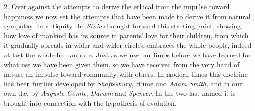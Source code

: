 \documentclass[12pt,a4paper,openany]{book}
\newcommand{\opage}[1]{\marginnote{\footnotesize\textit{[#1]}}}
\begin{document}
2. Over against the attempts to derive the ethical from the impulse toward
happiness we now set the attempts that have been made to derive it from
natural sympathy. In antiquity the \emph{Stoics} brought forward this starting
point, showing how love of \opage{33}mankind has its source in parents' love
for their children, from which it gradually spreads in wider and wider
circles, embraces the whole people, indeed at last the whole human race. Just
as we use our limbs before we have learned for what use we have been given
them, so we have received from the very hand of nature an impulse toward
community with others. In modern times this doctrine has been further
developed by \emph{Shaftesbury}, Hume and \emph{Adam Smith}, and in our own
day by \emph{Auguste Comte}, \emph{Darwin} and \emph{Spencer}. In the two last
named it is brought into connection with the hypothesis of evolution.
\end{document}
